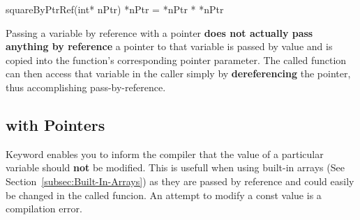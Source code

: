 \begin{itemize}
\begin{minipage}{\MPWxXSxLISTING\textwidth}
\begin{CPPCode}
squareByPtrRef(int* nPtr)
{
    *nPtr = *nPtr * *nPtr
}
    \end{CPPCode}
    \end{minipage}
\end{itemize}

\noindent Passing a variable by reference with a pointer \textbf{does not actually pass anything by reference} a pointer to that variable is passed by value and is copied into the function’s corresponding pointer parameter. The called function can then access that variable in the caller simply by \textbf{dereferencing} the pointer, thus accomplishing pass-by-reference.

\subsection{ with Pointers}
\label{subsec:Pointers-02-ImportantConcepts-02-const-with-Pointers}
Keyword  enables you to inform the compiler that the value of a particular variable should \textbf{not} be modified. This is usefull when using built-in arrays (See Section~\cref{subsec:Built-In-Arrays}) as they are passed by reference and could easily be changed in the called funcion. An attempt to modify a const value is a compilation error.









    

